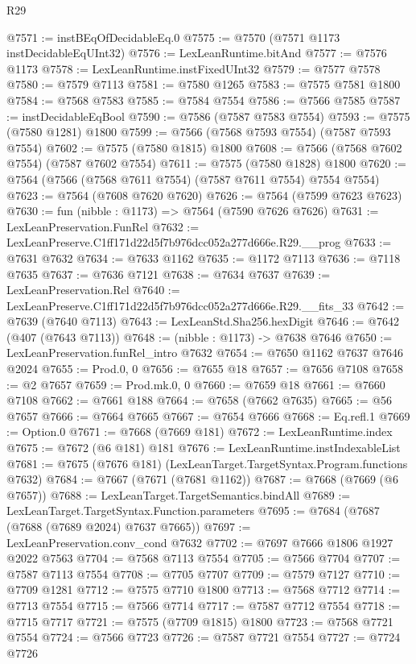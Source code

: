 \begin{lexlean}{R29}
\begin{coremodule}
@7571 := instBEqOfDecidableEq.{0}
@7575 := @7570 (@7571 @1173 instDecidableEqUInt32)
@7576 := LexLeanRuntime.bitAnd
@7577 := @7576 @1173
@7578 := LexLeanRuntime.instFixedUInt32
@7579 := @7577 @7578
@7580 := @7579 @7113
@7581 := @7580 @1265
@7583 := @7575 @7581 @1800
@7584 := @7568 @7583
@7585 := @7584 @7554
@7586 := @7566 @7585
@7587 := instDecidableEqBool
@7590 := @7586 (@7587 @7583 @7554)
@7593 := @7575 (@7580 @1281) @1800
@7599 := @7566 (@7568 @7593 @7554) (@7587 @7593 @7554)
@7602 := @7575 (@7580 @1815) @1800
@7608 := @7566 (@7568 @7602 @7554) (@7587 @7602 @7554)
@7611 := @7575 (@7580 @1828) @1800
@7620 := @7564 (@7566 (@7568 @7611 @7554) (@7587 @7611 @7554) @7554 @7554)
@7623 := @7564 (@7608 @7620 @7620)
@7626 := @7564 (@7599 @7623 @7623)
@7630 := fun (nibble : @1173) => @7564 (@7590 @7626 @7626)
@7631 := LexLeanPreservation.FunRel
@7632 := LexLeanPreserve.C1ff171d22d5f7b976dcc052a277d666e.R29.__prog
@7633 := @7631 @7632
@7634 := @7633 @1162
@7635 := @1172 @7113
@7636 := @7118 @7635
@7637 := @7636 @7121
@7638 := @7634 @7637
@7639 := LexLeanPreservation.Rel
@7640 := LexLeanPreserve.C1ff171d22d5f7b976dcc052a277d666e.R29.__fits_33
@7642 := @7639 (@7640 @7113)
@7643 := LexLeanStd.Sha256.hexDigit
@7646 := @7642 (@407 (@7643 @7113))
@7648 := (nibble : @1173) -> @7638 @7646
@7650 := LexLeanPreservation.funRel_intro @7632
@7654 := @7650 @1162 @7637 @7646 @2024
@7655 := Prod.{0, 0}
@7656 := @7655 @18
@7657 := @7656 @7108
@7658 := @2 @7657
@7659 := Prod.mk.{0, 0}
@7660 := @7659 @18
@7661 := @7660 @7108
@7662 := @7661 @188
@7664 := @7658 (@7662 @7635)
@7665 := @56 @7657
@7666 := @7664 @7665
@7667 := @7654 @7666
@7668 := Eq.refl.{1}
@7669 := Option.{0}
@7671 := @7668 (@7669 @181)
@7672 := LexLeanRuntime.index
@7675 := @7672 (@6 @181) @181
@7676 := LexLeanRuntime.instIndexableList
@7681 := @7675 (@7676 @181) (LexLeanTarget.TargetSyntax.Program.functions @7632)
@7684 := @7667 (@7671 (@7681 @1162))
@7687 := @7668 (@7669 (@6 @7657))
@7688 := LexLeanTarget.TargetSemantics.bindAll
@7689 := LexLeanTarget.TargetSyntax.Function.parameters
@7695 := @7684 (@7687 (@7688 (@7689 @2024) @7637 @7665))
@7697 := LexLeanPreservation.conv_cond @7632
@7702 := @7697 @7666 @1806 @1927 @2022 @7563
@7704 := @7568 @7113 @7554
@7705 := @7566 @7704
@7707 := @7587 @7113 @7554
@7708 := @7705 @7707
@7709 := @7579 @7127
@7710 := @7709 @1281
@7712 := @7575 @7710 @1800
@7713 := @7568 @7712
@7714 := @7713 @7554
@7715 := @7566 @7714
@7717 := @7587 @7712 @7554
@7718 := @7715 @7717
@7721 := @7575 (@7709 @1815) @1800
@7723 := @7568 @7721 @7554
@7724 := @7566 @7723
@7726 := @7587 @7721 @7554
@7727 := @7724 @7726

\end{coremodule}
\end{lexlean}
